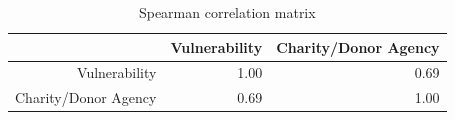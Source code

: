 \begin{table}[ht]
\centering
\begin{tabular}{rrr}
  \hline
 & Vulnerability & Charity/Donor Agency \\ 
  \hline
Vulnerability & 1.00 & 0.69 \\ 
  Charity/Donor Agency & 0.69 & 1.00 \\ 
   \hline
\end{tabular}
\caption{Spearman correlation matrix} 
\end{table}
